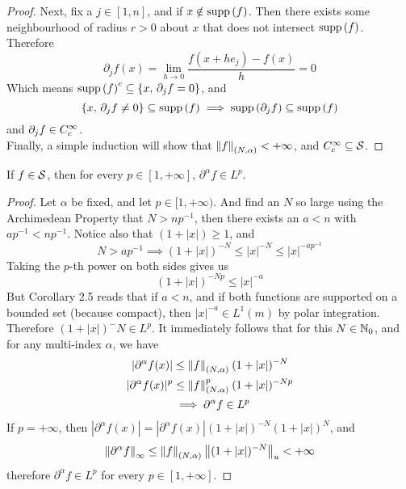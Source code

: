 \documentclass[../../main.tex]{subfiles}
\begin{document}
\begin{proof}
    Next, fix a $j\in[1,n]$, and if $x\notin \operatorname{supp}{(f)}$. Then there exists some neighbourhood of radius $r>0$ about $x$ that does not intersect $\operatorname{supp}{(f)}$. Therefore
    \[
    \partial_j f(x) = \lim_{h\to 0}\dfrac{f(x+he_j)-f(x)}{h}=0
    \]
    Which means $\operatorname{supp}{(f)}^c\subseteq\{x,\,\partial_j f=0\}$, and
    \[
    \{x,\,\partial_j f\neq 0\}\subseteq \operatorname{supp}{(f)}\implies \operatorname{supp}{(\partial_j f)}\subseteq\operatorname{supp}{(f)}
    \]
    and $\partial_j f\in C_c^\infty$.\\
    
    Finally, a simple induction will show that $\norm{f}_{(N,\alpha)}<+\infty$, and $C_c^\infty\subseteq\mathcal{S}$.
\end{proof}\newpage

\begin{wts}
    If $f\in\mathcal{S}$, then for every $p\in[1,+\infty]$, $\partial^\alpha f\in L^p$.
\end{wts}
\begin{proof}
    Let $\alpha$ be fixed, and let $p\in[1,+\infty)$. And find an $N$ so large using the Archimedean Property that $N>np^{-1}$, then there exists an $a<n$ with $ap^{-1}<np^{-1}$. Notice also that $(1+|x|)\geq 1$, and
    \[
    N>ap^{-1}\implies (1+|x|)^{-N}\leq |x|^{-N}\leq |x|^{-ap^{-1}}
    \]
    Taking the $p$-th power on both sides gives us
    \[
    (1+|x|)^{-Np}\leq |x|^{-a}
    \]
    But Corollary 2.5 reads that if $a<n$, and if both functions are supported on a bounded set (because compact), then $|x|^{-a}\in L^{1}(m)$ by polar integration. Therefore $(1+|x|)^-N\in L^p$. It immediately follows that for this $N\in\mathbb{N}_0$, and for any multi-index $\alpha$, we have
    \begin{align*}
    |\partial^\alpha f(x)|&\leq \norm{f}_{(N,\alpha)}\:(1+|x|)^{-N}\\
    |\partial^\alpha f(x)|^p&\leq \norm{f}_{(N,\alpha)}^p\:(1+|x|)^{-Np}\\
    &\implies \partial^\alpha f\in L^p
    \end{align*}
    If $p=+\infty$, then $|\partial^\alpha f(x)|=|\partial^\alpha f(x)|(1+|x|)^{-N}(1+|x|)^{N}$, and
    \[
    \norm{\partial^\alpha f}_\infty \leq \norm{f}_{(N,\alpha)}\:\norm{(1+|x|)^{-N}}_{u}<+\infty
    \]
    therefore $\partial^\alpha f\in L^p$ for every $p\in[1,+\infty]$.
\end{proof}
\newpage
\end{document}
